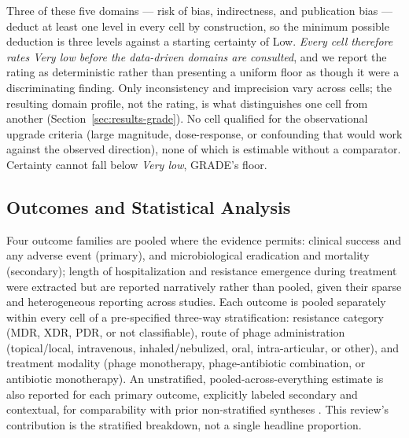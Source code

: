 Three of these five domains --- risk of bias, indirectness, and publication bias --- deduct at least one level in every cell by construction, so the minimum possible deduction is three levels against a starting certainty of Low. \emph{Every cell therefore rates Very low before the data-driven domains are consulted}, and we report the rating as deterministic rather than presenting a uniform floor as though it were a discriminating finding. Only inconsistency and imprecision vary across cells; the resulting domain profile, not the rating, is what distinguishes one cell from another (Section~\ref{sec:results-grade}). No cell qualified for the observational upgrade criteria (large magnitude, dose-response, or confounding that would work against the observed direction), none of which is estimable without a comparator. Certainty cannot fall below \emph{Very low}, GRADE's floor.

\subsection{Outcomes and Statistical Analysis}
\label{sec:methods-outcomes}

Four outcome families are pooled where the evidence permits: clinical success and any adverse event (primary), and microbiological eradication and mortality (secondary); length of hospitalization and resistance emergence during treatment were extracted but are reported narratively rather than pooled, given their sparse and heterogeneous reporting across studies. Each outcome is pooled separately within every cell of a pre-specified three-way stratification: resistance category (MDR, XDR, PDR, or not classifiable), route of phage administration (topical/local, intravenous, inhaled/nebulized, oral, intra-articular, or other), and treatment modality (phage monotherapy, phage-antibiotic combination, or antibiotic monotherapy). An unstratified, pooled-across-everything estimate is also reported for each primary outcome, explicitly labeled secondary and contextual, for comparability with prior non-stratified syntheses \parencite{ElHaddad2019_eskape,Uyttebroek2022_lancetid,Liu2025_ijaa}. This review's contribution is the stratified breakdown, not a single headline proportion.

